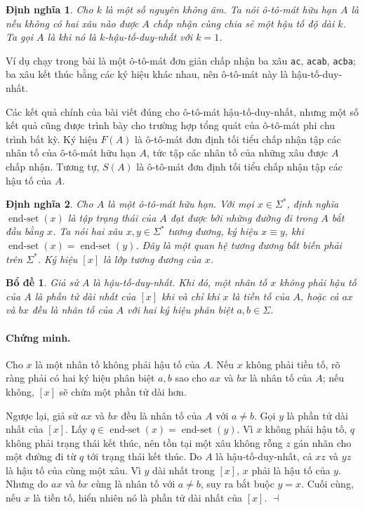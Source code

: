 \documentclass[11pt]{article}
\newtheorem{definition}{Định nghĩa}
\newtheorem{lemma}{Bổ đề}
\newenvironment{proof}{\paragraph{Chứng minh.}}{\hfill$\dashv$\par}
\newcommand{\End}{\operatorname{end\text{-}set}}
\begin{document}
\begin{definition}
Cho $k$ là một số nguyên không âm. Ta nói ô-tô-mát hữu hạn $A$ là
 nếu không có hai xâu nào được $A$ chấp nhận cùng
chia sẻ một hậu tố độ dài $k$. Ta gọi $A$ là  khi nó là
$k$-hậu-tố-duy-nhất với $k=1$.
\end{definition}

Ví dụ chạy trong bài là một ô-tô-mát đơn giản chấp nhận ba xâu \texttt{ac},
\texttt{acab}, \texttt{acba}; ba xâu kết thúc bằng các ký hiệu khác nhau, nên
ô-tô-mát này là hậu-tố-duy-nhất.

Các kết quả chính của bài viết đúng cho ô-tô-mát hậu-tố-duy-nhất, nhưng một
số kết quả cũng được trình bày cho trường hợp tổng quát của ô-tô-mát phi chu
trình bất kỳ. Ký hiệu $F(A)$ là ô-tô-mát đơn định tối tiểu chấp nhận tập các
nhân tố của ô-tô-mát hữu hạn $A$, tức tập các nhân tố của những xâu được $A$
chấp nhận. Tương tự, $S(A)$ là ô-tô-mát đơn định tối tiểu chấp nhận tập các
hậu tố của $A$.

\begin{definition}
Cho $A$ là một ô-tô-mát hữu hạn. Với mọi $x\in\Sigma^*$, định nghĩa
$\End(x)$ là tập trạng thái của $A$ đạt được bởi những đường đi trong $A$ bắt
đầu bằng $x$. Ta nói hai xâu $x,y\in\Sigma^*$ tương đương, ký hiệu $x\equiv y$,
khi $\End(x)=\End(y)$. Đây là một quan hệ tương đương bất biến phải trên
$\Sigma^*$. Ký hiệu $[x]$ là lớp tương đương của $x$.
\end{definition}

\begin{lemma}
Giả sử $A$ là hậu-tố-duy-nhất. Khi đó, một nhân tố $x$ không phải hậu tố của
$A$ là phần tử dài nhất của $[x]$ khi và chỉ khi $x$ là tiền tố của $A$, hoặc
cả $ax$ và $bx$ đều là nhân tố của $A$ với hai ký hiệu phân biệt
$a,b\in\Sigma$.
\end{lemma}

\begin{proof}
Cho $x$ là một nhân tố không phải hậu tố của $A$. Nếu $x$ không phải tiền tố,
rõ ràng phải có hai ký hiệu phân biệt $a,b$ sao cho $ax$ và $bx$ là nhân tố
của $A$; nếu không, $[x]$ sẽ chứa một phần tử dài hơn.

Ngược lại, giả sử $ax$ và $bx$ đều là nhân tố của $A$ với $a\ne b$. Gọi $y$ là
phần tử dài nhất của $[x]$. Lấy $q\in\End(x)=\End(y)$. Vì $x$ không phải hậu
tố, $q$ không phải trạng thái kết thúc, nên tồn tại một xâu không rỗng $z$ gán
nhãn cho một đường đi từ $q$ tới trạng thái kết thúc. Do $A$ là
hậu-tố-duy-nhất, cả $xz$ và $yz$ là hậu tố của cùng một xâu. Vì $y$ dài nhất
trong $[x]$, $x$ phải là hậu tố của $y$. Nhưng do $ax$ và $bx$ cùng là nhân tố
với $a\ne b$, suy ra bắt buộc $y=x$. Cuối cùng, nếu $x$ là tiền tố, hiển nhiên
nó là phần tử dài nhất của $[x]$.
\end{proof}
\end{document}
